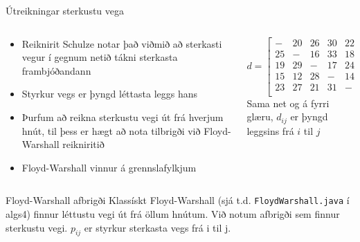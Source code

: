 \documentclass{beamer}
\begin{document}
\begin{frame}{Útreikningar sterkustu vega}
	\begin{columns}
		\begin{column}{0.5\textwidth}
			\begin{itemize}
				\item Reiknirit Schulze notar það viðmið að sterkasti vegur í gegnum netið tákni sterkasta frambjóðandann
				\item Styrkur vegs er þyngd léttasta leggs hans
				\item Þurfum að reikna sterkustu vegi út frá hverjum hnút, til þess er hægt að nota tilbrigði við Floyd-Warshall reikniritið
				\item Floyd-Warshall vinnur á grennslafylkjum
			\end{itemize}
		\end{column}
		\begin{column}{0.5\textwidth}
			\[ d =
				\begin{bmatrix}
					-  & 20 & 26 & 30 & 22 \\
					25 & -  & 16 & 33 & 18 \\
					19 & 29 & -  & 17 & 24 \\
					15 & 12 & 28 & -  & 14 \\
					23 & 27 & 21 & 31 & -  \\
				\end{bmatrix}
			\]
			Sama net og á fyrri glæru, $d_{ij}$ er þyngd leggsins frá $i$ til $j$
		\end{column}
	\end{columns}
\end{frame}

\begin{frame}[fragile]{Floyd-Warshall afbrigði}
	Klassískt Floyd-Warshall (sjá t.d. \texttt{FloydWarshall.java} í algs4) finnur léttustu vegi út frá öllum hnútum. Við notum afbrigði sem finnur sterkustu vegi.
	$p_{ij}$ er styrkur sterkasta vegs frá i til j.
\end{frame}
\end{document}
